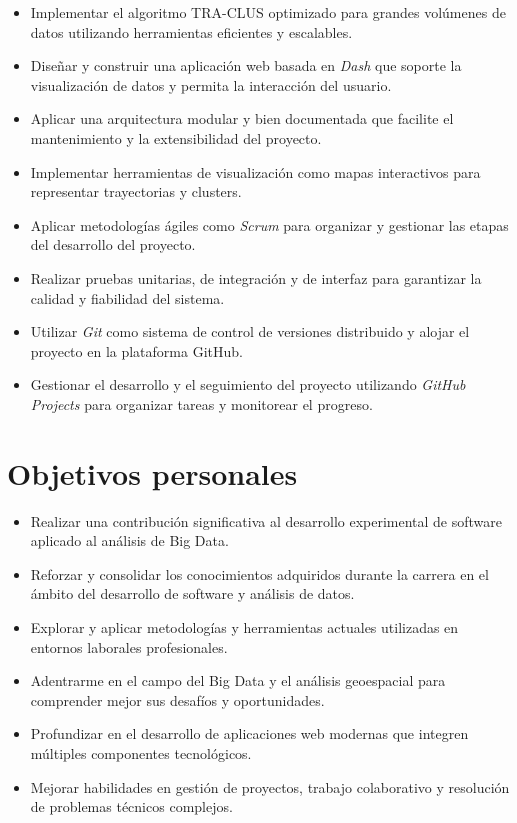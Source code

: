 \begin{itemize}
    \item Implementar el algoritmo TRA-CLUS optimizado para grandes volúmenes de datos utilizando herramientas eficientes y escalables.
    \item Diseñar y construir una aplicación web basada en \textit{Dash} que soporte la visualización de datos y permita la interacción del usuario.
    \item Aplicar una arquitectura modular y bien documentada que facilite el mantenimiento y la extensibilidad del proyecto.
    \item Implementar herramientas de visualización como mapas interactivos para representar trayectorias y clusters.
    \item Aplicar metodologías ágiles como \textit{Scrum} para organizar y gestionar las etapas del desarrollo del proyecto.
    \item Realizar pruebas unitarias, de integración y de interfaz para garantizar la calidad y fiabilidad del sistema.
    \item Utilizar \textit{Git} como sistema de control de versiones distribuido y alojar el proyecto en la plataforma GitHub.
    \item Gestionar el desarrollo y el seguimiento del proyecto utilizando \textit{GitHub Projects} para organizar tareas y monitorear el progreso.
\end{itemize}

\section{Objetivos personales}\label{objetivos-personales}

\begin{itemize}
    \item Realizar una contribución significativa al desarrollo experimental de software aplicado al análisis de Big Data.
    \item Reforzar y consolidar los conocimientos adquiridos durante la carrera en el ámbito del desarrollo de software y análisis de datos.
    \item Explorar y aplicar metodologías y herramientas actuales utilizadas en entornos laborales profesionales.
    \item Adentrarme en el campo del Big Data y el análisis geoespacial para comprender mejor sus desafíos y oportunidades.
    \item Profundizar en el desarrollo de aplicaciones web modernas que integren múltiples componentes tecnológicos.
    \item Mejorar habilidades en gestión de proyectos, trabajo colaborativo y resolución de problemas técnicos complejos.
\end{itemize}

